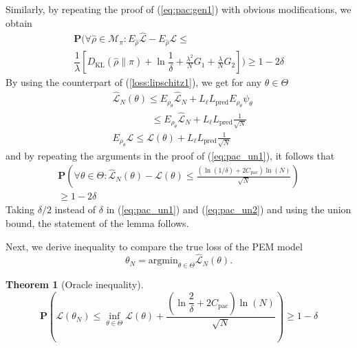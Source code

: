 \documentclass{ifacconf}
\def\eqref#1{(\ref{#1})}
\newcommand{\KL}{D_{\mathrm{KL}}}
\newcommand{\bP}{\mathbf{P}}
\newtheorem{Theorem}{Theorem}[section]
\begin{document}
\begin{pf}
Similarly, by repeating the proof of \eqref{eq:pac:gen1} with obvious modifications, we obtain
\begin{multline} \label{eq:pac:gen2}
        \bP\Big(\forall\hat{\rho}\in\mathcal{M}_\pi: E_{\hat{\rho}} \hat{\mathcal{L}} - E_{ \hat{\rho}}\mathcal{L} \le \\
        \dfrac{1}{\lambda}\!\left[ \KL(\hat{\rho} \|\pi) +
	\ln\dfrac{1}{\delta}+ %
  \frac{\lambda^2}{N}  G_1 +\frac{\lambda}{N}G_2  \right]\Big) \ge 1-2\delta
  \end{multline}
    By using 
    the counterpart of
    \eqref{loss:lipschitz1}, we get for any $\theta \in \Theta$
\begin{equation}
\begin{split}
    \label{loss:lipschitz2}
       &\hat{\mathcal{L}}_N(\theta) \le E_{\rho_{\theta}} \hat{\mathcal{L}}_N +L_{\ell}L_{\text{pred}} E_{\rho_{\theta}}\psi_\theta\\
       &\qquad\qquad\le 
       E_{\rho_{\theta}} \hat{\mathcal{L}}_N + L_{\ell}L_{\text{pred}}\frac{1}{\sqrt{N}} \\
      &E_{\rho_{\theta}} \mathcal{L} \le \mathcal{L}(\theta) + L_{\ell}L_{\text{pred}}\frac{1}{\sqrt{N}}
    \end{split}
\end{equation}
    and by repeating the arguments in the proof of \eqref{eq:pac_un1}, it follows that
    \begin{multline}
      \label{eq:pac_un2}
      \bP\left(\forall \theta \in \Theta: \hat{\mathcal{L}}_N(\theta) - \mathcal{L}(\theta) \le \frac{(\ln(1/\delta)+ 2C_{\text{pac}}) \ln(N)}{\sqrt{N}}\right)\\ \ge 1-2\delta
    \end{multline}
    Taking $\delta/2$ instead of $\delta$ in \eqref{eq:pac_un1} and \eqref{eq:pac_un2}
    and using the union bound, the statement of the lemma follows. 
\end{pf}
Next, we derive inequality to compare the true loss of the PEM model
\[ \theta_N = \textrm{argmin}_{\theta \in \Theta} \hat{\mathcal{L}}_N(\theta).\]
\begin{Theorem}[Oracle inequality]
\label{thm:oracle_inequality}
  \[
    \bP\left(\mathcal{L}(\theta_N) \le \inf_{\theta \in \Theta} \mathcal{L}(\theta) + \frac{(\ln\dfrac{2}{\delta}	+ 2C_{\text{pac}}) \ln(N)}{\sqrt{N}}\right) \ge 1-\delta
  \]
\end{Theorem}
\end{document}
